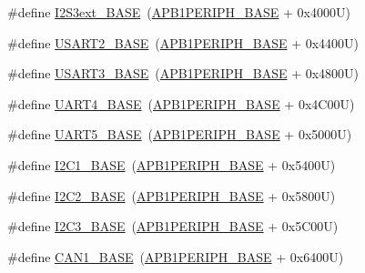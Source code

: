 \begin{DoxyCompactItemize}
\item 
\#define \hyperlink{group___peripheral__memory__map_ga89b61d6e6b09e94f3fccb7bef34e0263}{I2\+S3ext\+\_\+\+B\+A\+SE}~(\hyperlink{group___peripheral__memory__map_ga45666d911f39addd4c8c0a0ac3388cfb}{A\+P\+B1\+P\+E\+R\+I\+P\+H\+\_\+\+B\+A\+SE} + 0x4000\+U)
\item 
\#define \hyperlink{group___peripheral__memory__map_gade83162a04bca0b15b39018a8e8ec090}{U\+S\+A\+R\+T2\+\_\+\+B\+A\+SE}~(\hyperlink{group___peripheral__memory__map_ga45666d911f39addd4c8c0a0ac3388cfb}{A\+P\+B1\+P\+E\+R\+I\+P\+H\+\_\+\+B\+A\+SE} + 0x4400\+U)
\item 
\#define \hyperlink{group___peripheral__memory__map_gabe0d6539ac0026d598274ee7f45b0251}{U\+S\+A\+R\+T3\+\_\+\+B\+A\+SE}~(\hyperlink{group___peripheral__memory__map_ga45666d911f39addd4c8c0a0ac3388cfb}{A\+P\+B1\+P\+E\+R\+I\+P\+H\+\_\+\+B\+A\+SE} + 0x4800\+U)
\item 
\#define \hyperlink{group___peripheral__memory__map_ga94d92270bf587ccdc3a37a5bb5d20467}{U\+A\+R\+T4\+\_\+\+B\+A\+SE}~(\hyperlink{group___peripheral__memory__map_ga45666d911f39addd4c8c0a0ac3388cfb}{A\+P\+B1\+P\+E\+R\+I\+P\+H\+\_\+\+B\+A\+SE} + 0x4\+C00\+U)
\item 
\#define \hyperlink{group___peripheral__memory__map_gaa155689c0e206e6994951dc3cf31052a}{U\+A\+R\+T5\+\_\+\+B\+A\+SE}~(\hyperlink{group___peripheral__memory__map_ga45666d911f39addd4c8c0a0ac3388cfb}{A\+P\+B1\+P\+E\+R\+I\+P\+H\+\_\+\+B\+A\+SE} + 0x5000\+U)
\item 
\#define \hyperlink{group___peripheral__memory__map_gacd72dbffb1738ca87c838545c4eb85a3}{I2\+C1\+\_\+\+B\+A\+SE}~(\hyperlink{group___peripheral__memory__map_ga45666d911f39addd4c8c0a0ac3388cfb}{A\+P\+B1\+P\+E\+R\+I\+P\+H\+\_\+\+B\+A\+SE} + 0x5400\+U)
\item 
\#define \hyperlink{group___peripheral__memory__map_ga04bda70f25c795fb79f163b633ad4a5d}{I2\+C2\+\_\+\+B\+A\+SE}~(\hyperlink{group___peripheral__memory__map_ga45666d911f39addd4c8c0a0ac3388cfb}{A\+P\+B1\+P\+E\+R\+I\+P\+H\+\_\+\+B\+A\+SE} + 0x5800\+U)
\item 
\#define \hyperlink{group___peripheral__memory__map_ga4e8b9198748235a1729e1e8f8f24983b}{I2\+C3\+\_\+\+B\+A\+SE}~(\hyperlink{group___peripheral__memory__map_ga45666d911f39addd4c8c0a0ac3388cfb}{A\+P\+B1\+P\+E\+R\+I\+P\+H\+\_\+\+B\+A\+SE} + 0x5\+C00\+U)
\item 
\#define \hyperlink{group___peripheral__memory__map_gad8e45ea6c032d9fce1b0516fff9d8eaa}{C\+A\+N1\+\_\+\+B\+A\+SE}~(\hyperlink{group___peripheral__memory__map_ga45666d911f39addd4c8c0a0ac3388cfb}{A\+P\+B1\+P\+E\+R\+I\+P\+H\+\_\+\+B\+A\+SE} + 0x6400\+U)

\end{DoxyCompactItemize}
